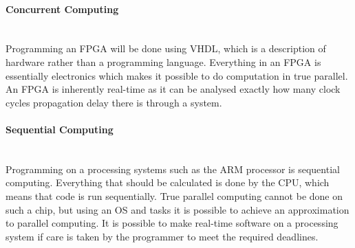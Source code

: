\paragraph{Concurrent Computing}~\\ %
\label{par:concurrent_computing}
Programming an FPGA will be done using VHDL, which is a description of hardware rather than a programming language. 
Everything in an FPGA is essentially electronics which makes it possible to do computation in true parallel. 
An FPGA is inherently real-time as it can be analysed exactly how many clock cycles propagation delay there is through a system.

\paragraph{Sequential Computing}~\\ %
\label{par:sequential_computing}
Programming on a processing systems such as the ARM processor is sequential computing. 
Everything that should be calculated is done by the CPU, which means that code is run sequentially.
True parallel computing cannot be done on such a chip, but using an OS and tasks it is possible to achieve an approximation to parallel computing.
It is possible to make real-time software on a processing system if care is taken by the programmer to meet the required deadlines. 

